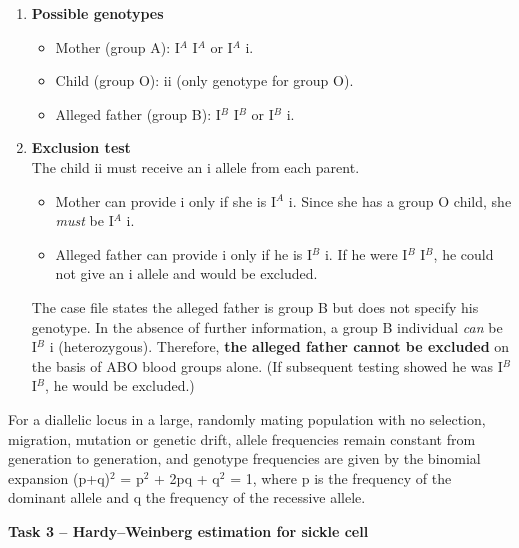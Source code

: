 \documentclass[11pt]{article}
\newcommand{\cle}[1]{{\popxbold\color{popdark}#1}}
\begin{document}
\begin{enumerate}
    \item \textbf{Possible genotypes}\\
    \begin{itemize}
        \item Mother (group A): \cle{I$^{A}$ I$^{A}$} or \cle{I$^{A}$ i}.
        \item Child (group O): \cle{ii} (only genotype for group O).
        \item Alleged father (group B): \cle{I$^{B}$ I$^{B}$} or \cle{I$^{B}$ i}.
    \end{itemize}
    \item \textbf{Exclusion test}\\
    The child \cle{ii} must receive an \cle{i} allele from each parent.
    \begin{itemize}
        \item Mother can provide \cle{i} only if she is \cle{I$^{A}$ i}. Since she has a group O child, she \emph{must} be \cle{I$^{A}$ i}.
        \item Alleged father can provide \cle{i} only if he is \cle{I$^{B}$ i}. If he were \cle{I$^{B}$ I$^{B}$}, he could not give an \cle{i} allele and would be excluded.
    \end{itemize}
    The case file states the alleged father is group B but does not specify his genotype. In the absence of further information, a group B individual \emph{can} be \cle{I$^{B}$ i} (heterozygous). Therefore, \textbf{the alleged father cannot be excluded} on the basis of ABO blood groups alone. (If subsequent testing showed he was \cle{I$^{B}$ I$^{B}$}, he would be excluded.)
\end{enumerate}

\begin{definition}
For a diallelic locus in a large, randomly mating population with no selection, migration, mutation or genetic drift, allele frequencies remain constant from generation to generation, and genotype frequencies are given by the binomial expansion \cle{(p+q)$^{2}$ = p$^{2}$ + 2pq + q$^{2}$ = 1}, where \cle{p} is the frequency of the dominant allele and \cle{q} the frequency of the recessive allele.
\end{definition}

\textbf{Task 3 – Hardy–Weinberg estimation for sickle cell}
\end{document}
